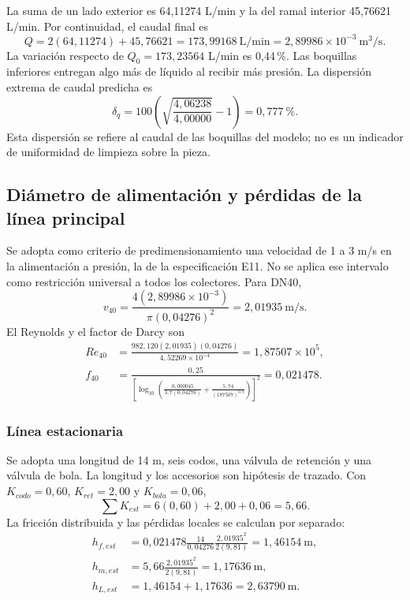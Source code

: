 La suma de un lado exterior es 64,11274 L/min y la del ramal interior
45,76621 L/min. Por continuidad, el caudal final es
\begin{equation}
 Q=2(64{,}11274)+45{,}76621
 =\boxed{173{,}99168\ \mathrm{L/min}}
 =\boxed{2{,}89986\times10^{-3}\ \mathrm{m^3/s}}.
 \label{eq:man-asp-qfinal}
\end{equation}
La variación respecto de $Q_0=173{,}23564$ L/min es 0,44\,\%.
Las boquillas inferiores entregan algo más de líquido al recibir más
presión. La dispersión extrema de caudal predicha es
\begin{equation}
 \delta_q=100\left(\sqrt{\frac{4{,}06238}{4{,}00000}}-1\right)
 =0{,}777\ \mathord{\text{\%}}.
\end{equation}
Esta dispersión se refiere al caudal de las boquillas del modelo; no es
un indicador de uniformidad de limpieza sobre la pieza.

\subsection{Diámetro de alimentación y pérdidas de la línea principal}
\label{sec:man-asp-alimentacion}

Se adopta como criterio de predimensionamiento una velocidad de 1 a
3 m/s en la alimentación a presión, la de la especificación E11. No se aplica ese intervalo como
restricción universal a todos los colectores. Para DN40,
\begin{equation}
 v_{40}=\frac{4(2{,}89986\times10^{-3})}{\pi(0{,}04276)^2}
 =\boxed{2{,}01935\ \mathrm{m/s}}.
 \label{eq:man-asp-v40}
\end{equation}
El Reynolds y el factor de Darcy son
\begin{align}
 Re_{40}&=\frac{982{,}120(2{,}01935)(0{,}04276)}{4{,}52269\times10^{-4}}
 =1{,}87507\times10^5,\\
 f_{40}&=\frac{0{,}25}{\left[\log_{10}\left(
 \frac{0{,}000045}{3{,}7(0{,}04276)}+
 \frac{5{,}74}{(187507)^{0{,}9}}\right)\right]^2}=0{,}021478.
\end{align}

\subsubsection{Línea estacionaria}
Se adopta una longitud de 14 m, seis codos, una válvula de retención y
una válvula de bola. La longitud y los accesorios son hipótesis de trazado.
Con $K_{codo}=0{,}60$, $K_{ret}=2{,}00$ y $K_{bola}=0{,}06$,
\begin{equation}
 \sum K_{est}=6(0{,}60)+2{,}00+0{,}06=5{,}66.
\end{equation}
La fricción distribuida y las pérdidas locales se calculan por separado:
\begin{align}
 h_{f,est}&=0{,}021478\frac{14}{0{,}04276}
 \frac{2{,}01935^2}{2(9{,}81)}=1{,}46154\ \mathrm{m},\\
 h_{m,est}&=5{,}66\frac{2{,}01935^2}{2(9{,}81)}=1{,}17636\ \mathrm{m},\\
 h_{L,est}&=1{,}46154+1{,}17636=\boxed{2{,}63790\ \mathrm{m}}.
 \label{eq:man-asp-hest}
\end{align}

